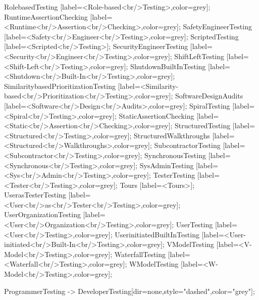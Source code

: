 \documentclass{article}
\begin{document}
{RolebasedTesting [label=<Role-based<br/>Testing>,color=grey];
RuntimeAssertionChecking [label=<Runtime<br/>Assertion<br/>Checking>,color=grey];
SafetyEngineerTesting [label=<Safety<br/>Engineer<br/>Testing>,color=grey];
ScriptedTesting [label=<Scripted<br/>Testing>];
SecurityEngineerTesting [label=<Security<br/>Engineer<br/>Testing>,color=grey];
ShiftLeftTesting [label=<Shift-Left<br/>Testing>,color=grey];
ShutdownBuiltInTesting [label=<Shutdown<br/>Built-In<br/>Testing>,color=grey];
SimilaritybasedPrioritizationTesting [label=<Similarity-based<br/>Prioritization<br/>Testing>,color=grey];
SoftwareDesignAudits [label=<Software<br/>Design<br/>Audits>,color=grey];
SpiralTesting [label=<Spiral<br/>Testing>,color=grey];
StaticAssertionChecking [label=<Static<br/>Assertion<br/>Checking>,color=grey];
StructuredTesting [label=<Structured<br/>Testing>,color=grey];
StructuredWalkthroughs [label=<Structured<br/>Walkthroughs>,color=grey];
SubcontractorTesting [label=<Subcontractor<br/>Testing>,color=grey];
SynchronousTesting [label=<Synchronous<br/>Testing>,color=grey];
SysAdminTesting [label=<Sys<br/>Admin<br/>Testing>,color=grey];
TesterTesting [label=<Tester<br/>Testing>,color=grey];
Tours [label=<Tours>];
UserasTesterTesting [label=<User<br/>as<br/>Tester<br/>Testing>,color=grey];
UserOrganizationTesting [label=<User<br/>Organization<br/>Testing>,color=grey];
UserTesting [label=<User<br/>Testing>,color=grey];
UserinitiatedBuiltInTesting [label=<User-initiated<br/>Built-In<br/>Testing>,color=grey];
VModelTesting [label=<V-Model<br/>Testing>,color=grey];
WaterfallTesting [label=<Waterfall<br/>Testing>,color=grey];
WModelTesting [label=<W-Model<br/>Testing>,color=grey];

ProgrammerTesting -> DeveloperTesting[dir=none,style="dashed",color="grey"];

}
\end{document}
